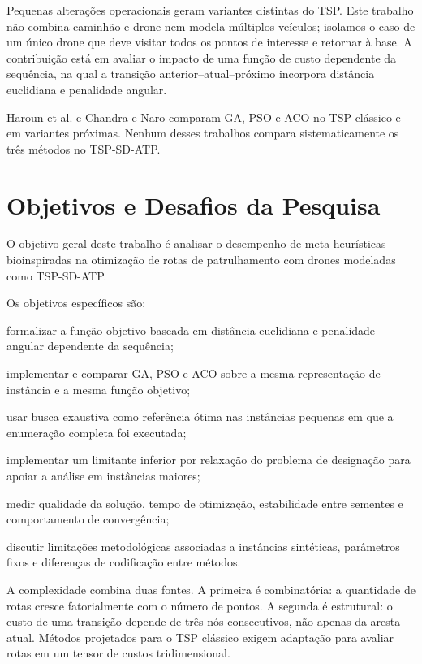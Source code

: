Pequenas alterações operacionais geram variantes distintas do \ac{TSP}. Este trabalho não combina caminhão e drone nem modela múltiplos veículos; isolamos o caso de um único drone que deve visitar todos os pontos de interesse e retornar à base. A contribuição está em avaliar o impacto de uma função de custo dependente da sequência, na qual a transição anterior--atual--próximo incorpora distância euclidiana e penalidade angular.

Haroun et al. \cite{haroun2015performance} e Chandra e Naro \cite{chandra2022comparative} comparam \ac{GA}, \ac{PSO} e \ac{ACO} no \ac{TSP} clássico e em variantes próximas. Nenhum desses trabalhos compara sistematicamente os três métodos no \ac{TSP-SD-ATP}.

\section{Objetivos e Desafios da Pesquisa}

O objetivo geral deste trabalho é analisar o desempenho de meta-heurísticas bioinspiradas na otimização de rotas de patrulhamento com drones modeladas como \ac{TSP-SD-ATP}.

Os objetivos específicos são:
\begin{alineas}
  \item formalizar a função objetivo baseada em distância euclidiana e penalidade angular dependente da sequência;
  \item implementar e comparar \ac{GA}, \ac{PSO} e \ac{ACO} sobre a mesma representação de instância e a mesma função objetivo;
  \item usar busca exaustiva como referência ótima nas instâncias pequenas em que a enumeração completa foi executada;
  \item implementar um limitante inferior por relaxação do problema de designação para apoiar a análise em instâncias maiores;
  \item medir qualidade da solução, tempo de otimização, estabilidade entre sementes e comportamento de convergência;
  \item discutir limitações metodológicas associadas a instâncias sintéticas, parâmetros fixos e diferenças de codificação entre métodos.
\end{alineas}

A complexidade combina duas fontes. A primeira é combinatória: a quantidade de rotas cresce fatorialmente com o número de pontos. A segunda é estrutural: o custo de uma transição depende de três nós consecutivos, não apenas da aresta atual. Métodos projetados para o \ac{TSP} clássico exigem adaptação para avaliar rotas em um tensor de custos tridimensional.


